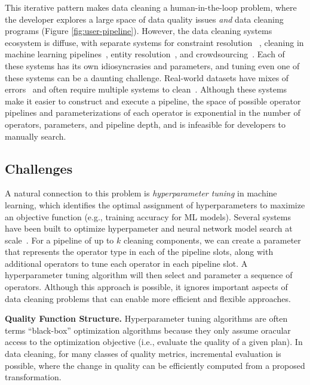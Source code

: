 This iterative pattern makes data cleaning a human-in-the-loop problem, where the developer explores a large space of data quality issues {\it and} data cleaning programs (Figure \ref{fig:user-pipeline}).  However, the data cleaning systems ecosystem is diffuse, with separate systems for constraint resolution ~\cite{rekatsinas2017holoclean}, cleaning in machine learning pipelines~\cite{DBLP:journals/pvldb/KrishnanWWFG16}, entity resolution~\cite{mudgal2018deep, doan2018toward}, and crowdsourcing~\cite{DBLP:journals/pvldb/HaasKWF015}.
Each of these systems has its own idiosyncrasies and parameters, and tuning even one of these systems can be a daunting challenge.
Real-world datasets have mixes of errors~\cite{krishnan2016hilda} and often require multiple systems to clean~\cite{DBLP:conf/sigmod/ChuIKW16}.
Although these systems make it easier to construct and execute a pipeline, the space of possible operator pipelines and parameterizations of each operator is exponential in the number of operators, parameters, and pipeline depth, and is infeasible for developers to manually search.


\subsection{Challenges}
A natural connection to this problem is \emph{hyperparameter tuning} in machine learning, which identifies the optimal assignment of hyperparameters to maximize an objective function (e.g., training accuracy for ML models).
Several systems have been built to optimize hyperpameter and neural network model search at scale~\cite{li2017hyperband, sparks2017keystoneml, baylor2017tfx, golovin2017google, liaw2018tune}.
For a pipeline of up to $k$ cleaning components, we can create a parameter that represents the operator type in each of the pipeline slots, along with additional operators to tune each operator in each pipeline slot.  A hyperparameter tuning algorithm will then select and parameter a sequence of operators. Although this approach is possible, it ignores important aspects of data cleaning problems that can enable more efficient and flexible approaches.  

\vspace{0.5em}
\noindent \textbf{Quality Function Structure. } Hyperparameter tuning algorithms are often terms ``black-box'' optimization algorithms because they only assume oracular access to the optimization objective (i.e., evaluate the quality of a given plan). In data cleaning, for many classes of quality metrics, incremental evaluation is possible, where the change in quality can be efficiently computed from a proposed transformation.  

